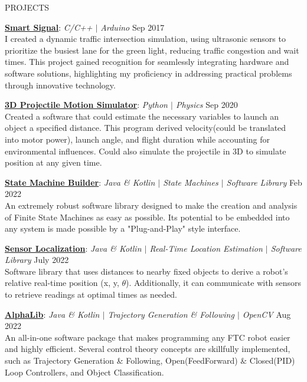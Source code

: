 \documentclass{resume} %
\begin{document}
\begin{rSection}{PROJECTS}
\vspace{-1.25em}
\item{\underline{\textbf{Smart Signal}}}: \textit{C/C++ $\vert$ Arduino} \hfill {Sep 2017}\vspace{0.25em} \\
{I created a dynamic traffic intersection simulation, using ultrasonic sensors to prioritize the busiest lane for the green light, reducing traffic congestion and wait times. This project gained recognition for seamlessly integrating hardware and software solutions, highlighting my proficiency in addressing practical problems through innovative technology.}

\item{\underline{\textbf{3D Projectile Motion Simulator}}}: \textit{Python $\vert$ Physics} \hfill {Sep 2020}\vspace{0.25em} \\
{Created a software that could estimate the necessary variables to launch an object a specified distance. This program derived velocity(could be translated into motor power), launch angle, and flight duration while accounting for environmental influences. Could also simulate the projectile in 3D to simulate position at any given time.}

\item{\underline{\textbf{State Machine Builder}}}: \textit{Java \& Kotlin $\vert$ State Machines $\vert$ Software Library} \hfill {Feb 2022}\vspace{0.25em} \\
{An extremely robust software library designed to make the creation and analysis of Finite State Machines as easy as possible. Its potential to be embedded into any system is made possible by a "Plug-and-Play" style interface.}

\item{\underline{\textbf{Sensor Localization}}}: \textit{Java \& Kotlin $\vert$ Real-Time Location Estimation $\vert$ Software Library} \hfill {July 2022} \vspace{0.25em}\\
{Software library that uses distances to nearby fixed objects to derive a robot's relative real-time position (x, y, $\theta$). Additionally, it can communicate with sensors to retrieve readings at optimal times as needed.}

\item{\underline{\textbf{AlphaLib}}}: \textit{Java \& Kotlin $\vert$ Trajectory Generation \& Following $\vert$ OpenCV} \hfill {Aug 2022} \vspace{0.25em}\\
{An all-in-one software package that makes programming any FTC robot easier and highly efficient. Several control theory concepts are skillfully implemented, such as Trajectory Generation \& Following, Open(FeedForward) \& Closed(PID) Loop Controllers, and Object Classification.}
\end{rSection} 
\end{document}
